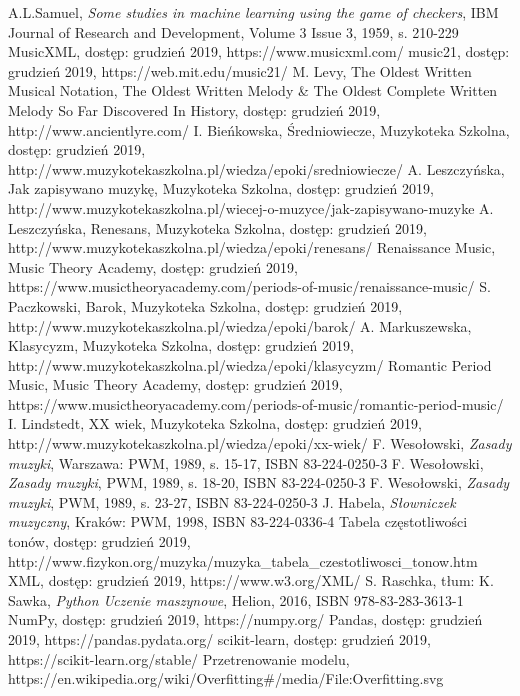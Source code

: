 \documentclass[printmode, eng]{mgr}
\begin{document}
\begin{flushleft}
\begin{thebibliography}{99}
 A.L.Samuel,
\emph{Some studies in machine learning using the game of checkers},
IBM Journal of Research and Development, Volume 3 Issue 3, 1959, s. 210-229
 MusicXML, dostęp: grudzień 2019, https://www.musicxml.com/
 music21, dostęp: grudzień  2019, https://web.mit.edu/music21/
 M. Levy, The Oldest Written Musical Notation, The Oldest Written Melody \& The Oldest Complete Written Melody So Far Discovered In History, dostęp: grudzień 2019, http://www.ancientlyre.com/
 I. Bieńkowska, Średniowiecze, Muzykoteka Szkolna, dostęp: grudzień  2019, http://www.muzykotekaszkolna.pl/wiedza/epoki/sredniowiecze/
 A. Leszczyńska, Jak zapisywano muzykę, Muzykoteka Szkolna, dostęp: grudzień  2019, http://www.muzykotekaszkolna.pl/wiecej-o-muzyce/jak-zapisywano-muzyke
 A. Leszczyńska, Renesans, Muzykoteka Szkolna, dostęp: grudzień  2019, http://www.muzykotekaszkolna.pl/wiedza/epoki/renesans/
 Renaissance Music, Music Theory Academy, dostęp: grudzień  2019,  https://www.musictheoryacademy.com/periods-of-music/renaissance-music/
 S. Paczkowski, Barok, Muzykoteka Szkolna, dostęp: grudzień 2019, http://www.muzykotekaszkolna.pl/wiedza/epoki/barok/
 A. Markuszewska, Klasycyzm, Muzykoteka Szkolna, dostęp: grudzień 2019, http://www.muzykotekaszkolna.pl/wiedza/epoki/klasycyzm/
 Romantic Period Music, Music Theory Academy, dostęp: grudzień 2019, 
https://www.musictheoryacademy.com/periods-of-music/romantic-period-music/
 I. Lindstedt, XX wiek, Muzykoteka Szkolna, dostęp: grudzień 2019, http://www.muzykotekaszkolna.pl/wiedza/epoki/xx-wiek/
 F. Wesołowski, \emph{Zasady muzyki}, Warszawa: PWM, 1989, s. 15-17, ISBN 83-224-0250-3 
 F. Wesołowski, \emph{Zasady muzyki}, PWM, 1989, s. 18-20, ISBN 83-224-0250-3 
 F. Wesołowski, \emph{Zasady muzyki}, PWM, 1989, s. 23-27, ISBN 83-224-0250-3 
 J. Habela, \emph{Słowniczek muzyczny},
 Kraków: PWM, 1998, ISBN 83-224-0336-4
 Tabela częstotliwości tonów, dostęp: grudzień 2019, http://www.fizykon.org/muzyka/muzyka\_tabela\_czestotliwosci\_tonow.htm
 XML, dostęp: grudzień 2019, https://www.w3.org/XML/
 S. Raschka, tłum: K. Sawka, \emph{Python Uczenie maszynowe}, Helion, 2016, ISBN 978-83-283-3613-1
 NumPy, dostęp: grudzień 2019, https://numpy.org/
 Pandas, dostęp: grudzień 2019, https://pandas.pydata.org/
 scikit-learn, dostęp: grudzień 2019, https://scikit-learn.org/stable/
 Przetrenowanie modelu, https://en.wikipedia.org/wiki/Overfitting\#/media/File:Overfitting.svg
\end{thebibliography}
\end{flushleft}
\end{document}
